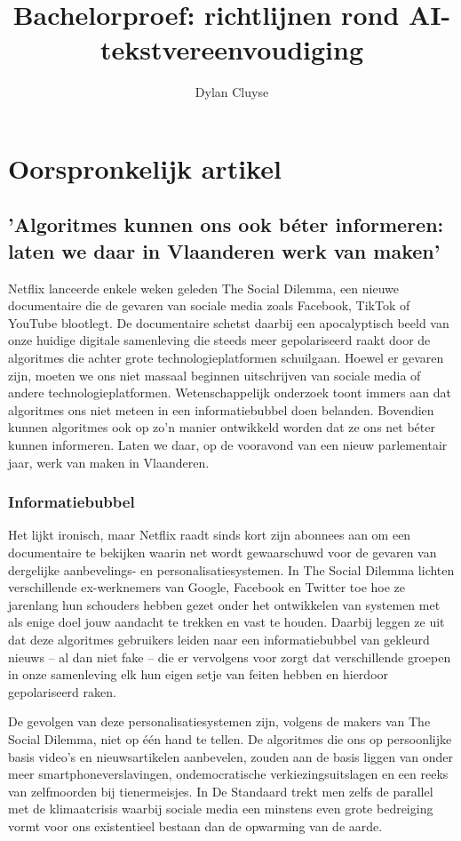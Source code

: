 \documentclass{report}
\title{Bachelorproef: richtlijnen rond AI-tekstvereenvoudiging}
\author{Dylan Cluyse}
\begin{document}
\chapter{Oorspronkelijk artikel}
\section{'Algoritmes kunnen ons ook béter informeren: laten we daar in Vlaanderen werk van maken'}

Netflix lanceerde enkele weken geleden The Social Dilemma, een nieuwe documentaire die de gevaren van sociale media zoals Facebook, TikTok of YouTube blootlegt. De documentaire schetst daarbij een apocalyptisch beeld van onze huidige digitale samenleving die steeds meer gepolariseerd raakt door de algoritmes die achter grote technologieplatformen schuilgaan. Hoewel er gevaren zijn, moeten we ons niet massaal beginnen uitschrijven van sociale media of andere technologieplatformen. Wetenschappelijk onderzoek toont immers aan dat algoritmes ons niet meteen in een informatiebubbel doen belanden. Bovendien kunnen algoritmes ook op zo’n manier ontwikkeld worden dat ze ons net béter kunnen informeren. Laten we daar, op de vooravond van een nieuw parlementair jaar, werk van maken in Vlaanderen.

\subsection{Informatiebubbel}


Het lijkt ironisch, maar Netflix raadt sinds kort zijn abonnees aan om een documentaire te bekijken waarin net wordt gewaarschuwd voor de gevaren van dergelijke aanbevelings- en personalisatiesystemen. In The Social Dilemma lichten verschillende ex-werknemers van Google, Facebook en Twitter toe hoe ze jarenlang hun schouders hebben gezet onder het ontwikkelen van systemen met als enige doel jouw aandacht te trekken en vast te houden. Daarbij leggen ze uit dat deze algoritmes gebruikers leiden naar een informatiebubbel van gekleurd nieuws – al dan niet fake – die er vervolgens voor zorgt dat verschillende groepen in onze samenleving elk hun eigen setje van feiten hebben en hierdoor gepolariseerd raken.


De gevolgen van deze personalisatiesystemen zijn, volgens de makers van The Social Dilemma, niet op één hand te tellen. De algoritmes die ons op persoonlijke basis video’s en nieuwsartikelen aanbevelen, zouden aan de basis liggen van onder meer smartphoneverslavingen, ondemocratische verkiezingsuitslagen en een reeks van zelfmoorden bij tienermeisjes. In De Standaard trekt men zelfs de parallel met de klimaatcrisis waarbij sociale media een minstens even grote bedreiging vormt voor ons existentieel bestaan dan de opwarming van de aarde.
\end{document}
